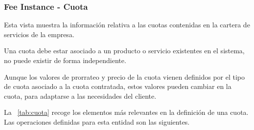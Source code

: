 \subsubsection{Fee Instance - Cuota}
\label{sub:fee}

Esta vista muestra la información relativa a las cuotas contenidas en la cartera de servicios de la empresa.

Una cuota debe estar asociado a un producto o servicio existentes en el sistema, no puede existir de forma independiente.

Aunque los valores de prorrateo y precio de la cuota vienen definidos por el tipo de cuota asociado a la cuota contratada, estos valores pueden cambiar en la cuota, para adaptarse a las necesidades del cliente.

La \tablename~\ref{tab:cuota} recoge los elementos más relevantes en la definición de una cuota.
Las operaciones definidas para esta entidad son las siguientes.

